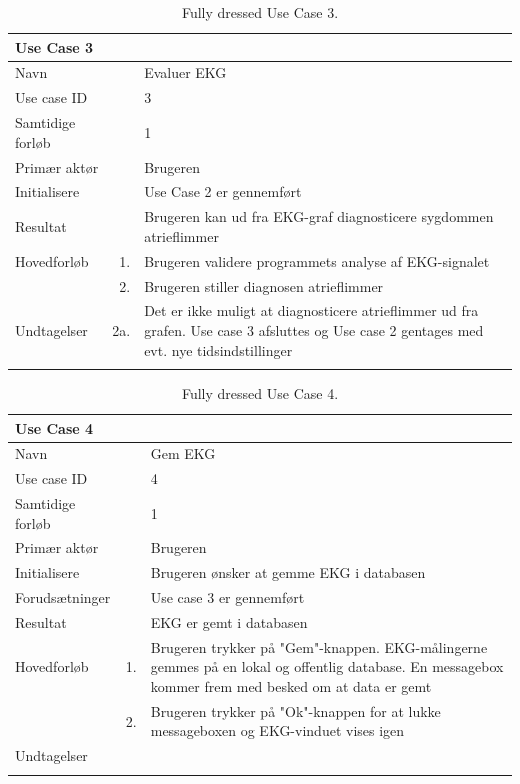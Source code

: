 \begin{longtabu} to  %
    {\large \textbf{Use Case 3}} && \\
    \toprule
    Navn &&    Evaluer EKG\\
    Use case ID &&    3\\
    Samtidige forløb &&    1\\
    Primær aktør &&    Brugeren\\
    Initialisere &&    Use Case 2 er gennemført   \\
    Resultat &&   Brugeren kan ud fra EKG-graf diagnosticere sygdommen atrieflimmer  \\ \midrule
    Hovedforløb &    1. &    Brugeren validere programmets analyse af EKG-signalet \\[-1ex]	
                &    2. &    Brugeren stiller diagnosen atrieflimmer\\ \midrule
                
    Undtagelser &    2a. &    Det er ikke muligt at diagnosticere atrieflimmer ud fra grafen. Use case 3 afsluttes og Use case 2 gentages med evt. nye tidsindstillinger \\ \bottomrule
\caption{Fully dressed Use Case 3.}
\label{UC3}
\end{longtabu}

\begin{longtabu} to  %
    {\large \textbf{Use Case 4}} && \\
    \toprule
    Navn &&    Gem EKG\\
    Use case ID &&    4\\
    Samtidige forløb &&    1\\
    Primær aktør &&    Brugeren\\
    Initialisere &&    Brugeren ønsker at gemme EKG i databasen\\
    Forudsætninger &&  Use case 3 er gennemført\\
    Resultat &&    EKG er gemt i databasen                    \\ \midrule
    Hovedforløb &    1. &    Brugeren trykker på "Gem"-knappen. EKG-målingerne gemmes på en lokal og offentlig database. En messagebox kommer frem med besked om at data er gemt\\[-1ex]   						 	
                &    2. &	Brugeren trykker på "Ok"-knappen for at lukke messageboxen og EKG-vinduet vises igen
                	\\ \midrule
                
    Undtagelser &       \\ \bottomrule
\caption{Fully dressed Use Case 4.}
\label{UC4}
\end{longtabu}

